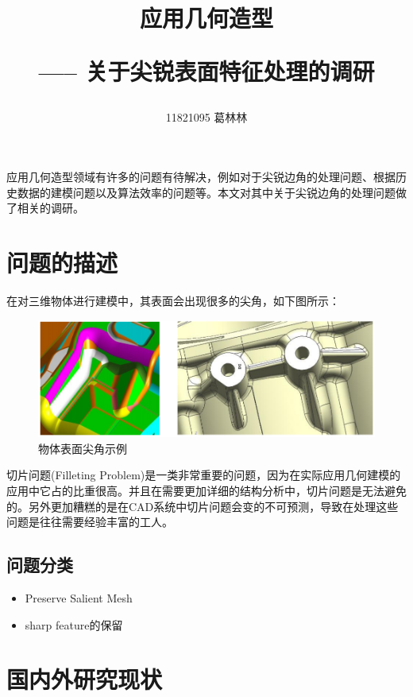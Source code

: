 \documentclass[11pt]{article}
\title{应用几何造型 \hspace{2pt}\hspace{2pt} \begin{large}----- \hspace{2pt} 关于尖锐表面特征处理的调研 \end{large} }
\author{11821095 葛林林}
\begin{document}
\maketitle
应用几何造型领域有许多的问题有待解决，例如对于尖锐边角的处理问题、根据历史数据的建模问题以及算法效率的问题等。本文对其中关于尖锐边角的处理问题做了相关的调研。
\section{问题的描述}
在对三维物体进行建模中，其表面会出现很多的尖角，如下图所示：
\begin{figure}[H]
\begin{center}
\includegraphics[scale=0.7]{sharp_features.png}
\end{center}
\caption{物体表面尖角示例}
\end{figure}
切片问题(Filleting Problem)是一类非常重要的问题，因为在实际应用几何建模的应用中它占的比重很高。并且在需要更加详细的结构分析中，切片问题是无法避免的。另外更加糟糕的是在CAD系统中切片问题会变的不可预测，导致在处理这些问题是往往需要经验丰富的工人。

\subsection{问题分类}
\begin{itemize}
\item{Preserve Salient Mesh}

\item{sharp feature的保留}

\end{itemize}

\section{国内外研究现状}
\end{document}
